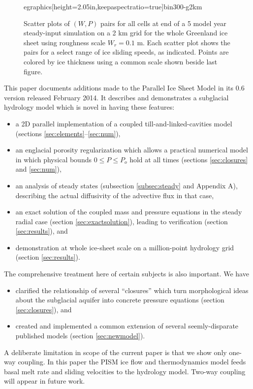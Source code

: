 \documentclass[gmd]{copernicus}   %
\begin{document}
\begin{figure}[ht]
{egraphics[height=2.05in,keepaspectratio=true]{bin300-g2km}}
\caption{Scatter plots of $(W,P)$ pairs for all cells at end of a 5 model year steady-input simulation on a 2 km grid for the whole Greenland ice sheet using roughness scale $W_r = 0.1$ m.  Each scatter plot shows the pairs for a select range of ice sliding speeds, as indicated.  Points are colored by ice thickness using a common scale shown beside last figure.}
\label{fig:GreenisPofW}
\end{figure}


\conclusions  \label{sec:conclusion}  This paper documents additions made to the Parallel Ice Sheet Model in its 0.6 version released February 2014.  It describes and demonstrates a subglacial hydrology model which is novel in having these features:\begin{itemize}
\item a 2D parallel implementation of a coupled till-and-linked-cavities model (sections \ref{sec:elements}--\ref{sec:num}),
\item an englacial porosity regularization which allows a practical numerical model in which physical bounds $0\le P \le P_o$ hold at all times (sections \ref{sec:closures} and \ref{sec:num}),
\item an analysis of steady states (subsection \ref{subsec:steady} and Appendix A), describing the actual diffusivity of the advective flux in that case,
\item an exact solution of the coupled mass and pressure equations in the steady radial case (section \ref{sec:exactsolution}), leading to verification (section \ref{sec:results}), and
\item demonstration at whole ice-sheet scale on a million-point hydrology grid (section \ref{sec:results}).
\end{itemize}
The comprehensive treatment here of certain subjects is also important.  We have
\begin{itemize}
\item clarified the relationship of several ``closures'' which turn morphological ideas about the subglacial aquifer into concrete pressure equations (section \ref{sec:closures}), and
\item created and implemented a common extension of several seemly-disparate published models (section \ref{sec:newmodel}).
\end{itemize}
A deliberate limitation in scope of the current paper is that we show only one-way coupling.  In this paper the PISM ice flow and thermodynamics model feeds basal melt rate and sliding velocities to the hydrology model.  Two-way coupling  will appear in future work.
\end{document}
